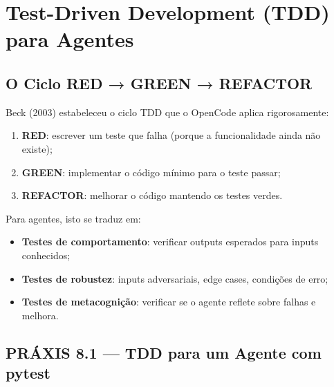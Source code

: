 \section{Test-Driven Development (TDD) para Agentes}

\subsection{O Ciclo RED → GREEN → REFACTOR}

Beck (2003) \cite{beck2003tdd} estabeleceu o ciclo TDD que o OpenCode aplica rigorosamente:

\begin{enumerate}
    \item \textbf{RED}: escrever um teste que falha (porque a funcionalidade ainda não existe);
    \item \textbf{GREEN}: implementar o código mínimo para o teste passar;
    \item \textbf{REFACTOR}: melhorar o código mantendo os testes verdes.
\end{enumerate}

Para agentes, isto se traduz em:
\begin{itemize}
    \item \textbf{Testes de comportamento}: verificar outputs esperados para inputs conhecidos;
    \item \textbf{Testes de robustez}: inputs adversariais, edge cases, condições de erro;
    \item \textbf{Testes de metacognição}: verificar se o agente reflete sobre falhas e melhora.
\end{itemize}

\subsection{PRÁXIS 8.1 — TDD para um Agente com pytest}

